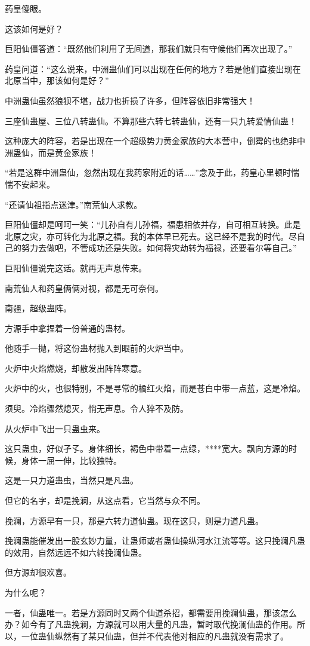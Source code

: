 \begin{this_body}
药皇傻眼。

这该如何是好？

巨阳仙僵答道：“既然他们利用了无间道，那我们就只有守候他们再次出现了。”

药皇问道：“这么说来，中洲蛊仙们可以出现在任何的地方？若是他们直接出现在北原当中，那该如何是好？”

中洲蛊仙虽然狼狈不堪，战力也折损了许多，但阵容依旧非常强大！

三座仙蛊屋、三位八转蛊仙。不算那些六转七转蛊仙，还有一只九转爱情仙蛊！

这种庞大的阵容，若是出现在一个超级势力黄金家族的大本营中，倒霉的也绝非中洲蛊仙，而是黄金家族！

“若是这群中洲蛊仙，忽然出现在我药家附近的话……”念及于此，药皇心里顿时惴惴不安起来。

“还请仙祖指点迷津。”南荒仙人求教。

巨阳仙僵却是呵呵一笑：“儿孙自有儿孙福，福患相依并存，自可相互转换。此是北原之灾，亦可转化为北原之福。我的本体早已死去。这已经不是我的时代。尽自己的努力去做吧，不管成功还是失败。如何将灾劫转为福禄，还要看尔等自己。”

巨阳仙僵说完这话。就再无声息传来。

南荒仙人和药皇俩俩对视，都是无可奈何。

南疆，超级蛊阵。

方源手中拿捏着一份普通的蛊材。

他随手一抛，将这份蛊材抛入到眼前的火炉当中。

火炉中火焰燃烧，却散发出阵阵寒意。

火炉中的火，也很特别，不是寻常的橘红火焰，而是苍白中带一点蓝，这是冷焰。

须臾。冷焰骤然熄灭，悄无声息。令人猝不及防。

从火炉中飞出一只蛊虫来。

这只蛊虫，好似孑孓。身体细长，褐色中带着一点绿，****宽大。飘向方源的时候，身体一屈一伸，比较独特。

这是一只力道蛊虫，当然只是凡蛊。

但它的名字，却是挽澜，从这点看，它当然与众不同。

挽澜，方源早有一只，那是六转力道仙蛊。现在这只，则是力道凡蛊。

挽澜蛊能催发出一股玄妙力量，让蛊师或者蛊仙操纵河水江流等等。这只挽澜凡蛊的效用，自然远远不如六转挽澜仙蛊。

但方源却很欢喜。

为什么呢？

一者，仙蛊唯一。若是方源同时又两个仙道杀招，都需要用挽澜仙蛊，那该怎么办？如今有了凡蛊挽澜，方源就可以用大量的凡蛊，暂时取代挽澜仙蛊的作用。所以，一位蛊仙纵然有了某只仙蛊，但并不代表他对相应的凡蛊就没有需求了。


\end{this_body}
